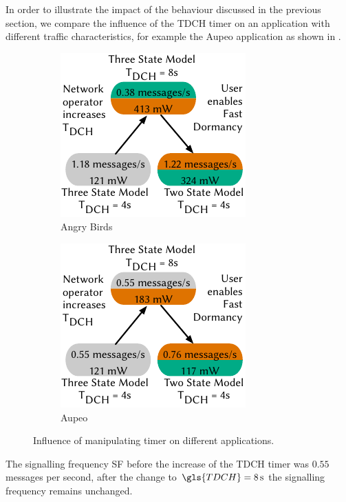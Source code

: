 In order to illustrate the impact of the behaviour discussed in the previous section, we compare the influence of the \gls{TDCH} timer on an application with different traffic characteristics, for example the Aupeo application as shown in .
\begin{figure}
	\begin{subfigure}[b]{.5\textwidth}
	\centering
	\includegraphics{network/network_traces/numerical_results/figures/consequences_angry_birds}
	\caption{Angry Birds}\label{fig:network:network_traces:numerical_results:consequences:angry_birds}
	\end{subfigure} 
	\begin{subfigure}[b]{.5\textwidth}
	\centering
	\includegraphics{network/network_traces/numerical_results/figures/consequences_aupeo}
	\caption{Aupeo}\label{fig:network:network_traces:numerical_results:consequences:aupeo}
	\end{subfigure}

	\caption{Influence of manipulating  timer on different applications.}\label{fig:network:network_traces:numerical_results:consequences}
\end{figure}
The signalling frequency \gls{SF} before the increase of the \gls{TDCH} timer was \(0.55\) messages per second, after the change to \(\gls{TDCH} = \SI{8}{\second}\) the signalling frequency remains unchanged.
